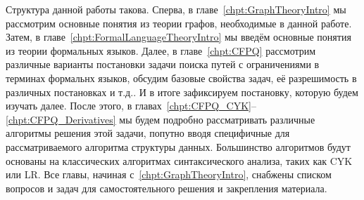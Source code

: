 Структура данной работы такова.
Сперва, в главе~\ref{chpt:GraphTheoryIntro} мы рассмотрим основные понятия из теории графов, необходимые в данной работе.
Затем, в главе~\ref{chpt:FormalLanguageTheoryIntro} мы введём основные понятия из теории формальных языков.
Далее, в главе~\ref{chpt:CFPQ} рассмотрим различные варианты постановки задачи поиска путей с ограничениями в терминах формальнх языков, обсудим базовые свойства задач, её разрешимость в различных постановках и т.д..
И в итоге зафиксируем постановку, которую будем изучать далее.
После этого, в главах~\ref{chpt:CFPQ_CYK}--\ref{chpt:CFPQ_Derivatives} мы будем подробно рассматривать различные алгоритмы решения этой задачи, попутно вводя специфичные для рассматриваемого алгоритма структуры данных.
Большинство алгоритмов будут основаны на классических алгоритмах синтаксического анализа, таких как CYK или LR.
Все главы, начиная с~\ref{chpt:GraphTheoryIntro}, снабжены списком вопросов и задач для самостоятельного решения и закрепления материала.